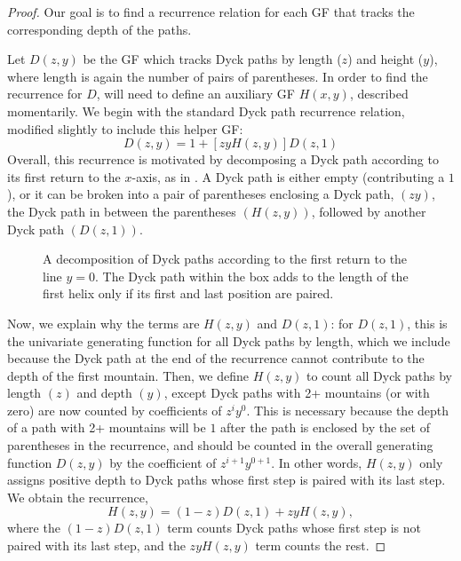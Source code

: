 \documentclass[10pt,a4paper]{amsart}
\begin{document}
\begin{proof}
    Our goal is to find a recurrence relation for each GF that tracks the corresponding depth of the paths.

    Let $D(z,y)$ be the GF which tracks Dyck paths by length ($z$) and height ($y$), where length is again the number of pairs of parentheses.  In order to find the recurrence for $D$, will need to define an auxiliary GF $H(x, y)$, described momentarily.  We begin with the standard Dyck path recurrence relation, modified slightly to include this helper GF:
    \[
    D(z, y) = 1 + [zy H(z,y)] D(z,1) 
    \]
    Overall, this recurrence is motivated by decomposing a Dyck path according to its first return to the $x$-axis, as in .  A Dyck path is either empty (contributing a $1$), or it can be broken into a pair of parentheses enclosing a Dyck path, $(zy)$, the Dyck path in between the parentheses $(H(z, y))$, followed by another Dyck path $(D(z, 1))$.

    \begin{figure}
        \begin{center}
        
        \caption{A decomposition of Dyck paths according to the first return to the line $y = 0$.  The Dyck path within the box adds to the length of the first helix only if its first and last position are paired.} \label{fig:Dyck}
        \end{center}
    \end{figure}
    Now, we explain why the terms are $H(z, y)$ and $D(z, 1)$: for $D(z, 1)$, this is the univariate generating function for all Dyck paths by length, which we include because the Dyck path at the end of the recurrence cannot contribute to the depth of the first mountain.  Then, we define $H(z,y)$ to count all Dyck paths by length $(z)$ and depth $(y)$, except Dyck paths with 2+ mountains (or with zero) are now counted by coefficients of $z^i y^0$.  This is necessary because the depth of a path with 2+ mountains will be $1$ after the path is enclosed by the set of parentheses in the recurrence, and should be counted in the overall generating function $D(z, y)$ by the coefficient of $z^{i + 1} y^{0 + 1}$.  In other words, $H(z, y)$ only assigns positive depth to Dyck paths whose first step is paired with its last step.  We obtain the recurrence,
    \[
    H(z,y) = (1-z) D(z,1) + zy H(z,y),
    \]
    where the $(1-z)D(z, 1)$ term counts Dyck paths whose first step is not paired with its last step, and the $zyH(z, y)$ term counts the rest.


\end{proof}
\end{document}
